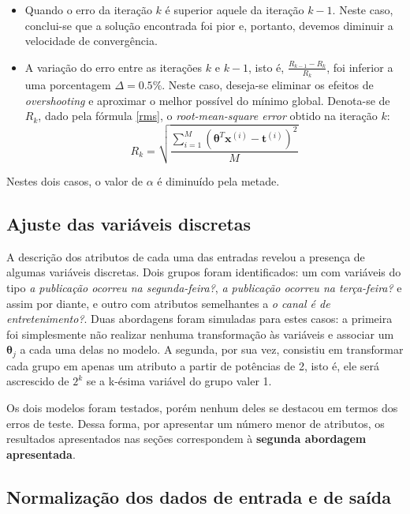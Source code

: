 \documentclass[10pt,twocolumn,letterpaper]{article}
\begin{document}
\begin{itemize}
	\item Quando o erro da iteração \(k\) é superior aquele da iteração \(k -1\). Neste caso, conclui-se que a solução encontrada foi pior e, portanto, devemos diminuir a velocidade de convergência.
	\item A variação do erro entre as iterações \(k\) e \(k -1\), isto é, \(\frac{R_{k - 1} - R_k}{R_k}\), foi inferior a uma porcentagem \(\Delta = 0.5\%\). Neste caso, deseja-se eliminar os efeitos de \textit{overshooting} e aproximar o melhor possível do mínimo global. Denota-se de \(R_k\), dado pela fórmula \ref {rms}, o \textit{root-mean-square error} obtido na iteração \(k\):
	\begin {equation}
	\label{rms}
	R_k = \sqrt{\frac {\sum_{i=1}^{M} \left(\bm{\theta}^T\bm{x}^{(i)} - \bm{t}^{(i)}\right)^2}{M}}
	\end{equation}
\end{itemize}

Nestes dois casos, o valor de \(\alpha\) é diminuído pela metade.

\subsection {Ajuste das variáveis discretas}

A descrição dos atributos de cada uma das entradas revelou a presença de algumas variáveis discretas. Dois grupos foram identificados: um com variáveis do tipo \textit{a publicação ocorreu na segunda-feira?}, \textit{a publicação ocorreu na terça-feira?} e assim por diante, e outro com atributos semelhantes a \textit{o canal é de entretenimento?}. Duas abordagens foram simuladas para estes casos: a primeira foi simplesmente não realizar nenhuma transformação às variáveis e associar um \(\bm{\theta}_j\) a cada uma delas no modelo. A segunda, por sua vez, consistiu em transformar cada grupo em apenas um atributo a partir de potências de 2, isto é, ele será ascrescido de \(2^k\) se a k-ésima variável do grupo valer 1.

Os dois modelos foram testados, porém nenhum deles se destacou em termos dos erros de teste. Dessa forma, por apresentar um número menor de atributos, os resultados apresentados nas seções correspondem à \textbf{segunda abordagem apresentada}.

\subsection {Normalização dos dados de entrada e de saída}
\end{document}
